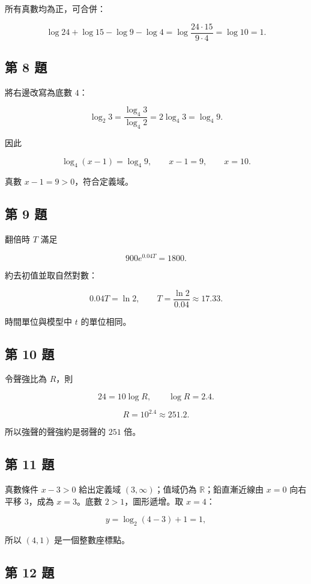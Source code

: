 \documentclass[11pt,a4paper]{article}
\begin{document}
所有真數均為正，可合併：

\[
\log24+\log15-\log9-\log4
=\log\frac{24\cdot15}{9\cdot4}
=\log10=1.
\]

\subsection{第 8 題}\label{ux7b2c-8-ux984c}

將右邊改寫為底數 \(4\)：

\[
\log_2 3=\frac{\log_4 3}{\log_4 2}=2\log_4 3=\log_4 9.
\]

因此

\[
\log_4(x-1)=\log_4 9,\qquad x-1=9,\qquad x=10.
\]

真數 \(x-1=9>0\)，符合定義域。

\subsection{第 9 題}\label{ux7b2c-9-ux984c}

翻倍時 \(T\) 滿足

\[
900e^{0.04T}=1800.
\]

約去初值並取自然對數：

\[
0.04T=\ln2,\qquad
T=\frac{\ln2}{0.04}\approx17.33.
\]

時間單位與模型中 \(t\) 的單位相同。

\subsection{第 10 題}\label{ux7b2c-10-ux984c}

令聲強比為 \(R\)，則

\[
24=10\log R,\qquad \log R=2.4.
\]

\[
R=10^{2.4}\approx251.2.
\]

所以強聲的聲強約是弱聲的 \(251\) 倍。

\subsection{第 11 題}\label{ux7b2c-11-ux984c}

真數條件 \(x-3>0\) 給出定義域 \((3,\infty)\)；值域仍為 \(\mathbb R\)；鉛直漸近線由 \(x=0\) 向右平移 \(3\)，成為 \(x=3\)。底數 \(2>1\)，圖形遞增。取 \(x=4\)：

\[
y=\log_2(4-3)+1=1,
\]

所以 \((4,1)\) 是一個整數座標點。

\subsection{第 12 題}\label{ux7b2c-12-ux984c}
\end{document}

